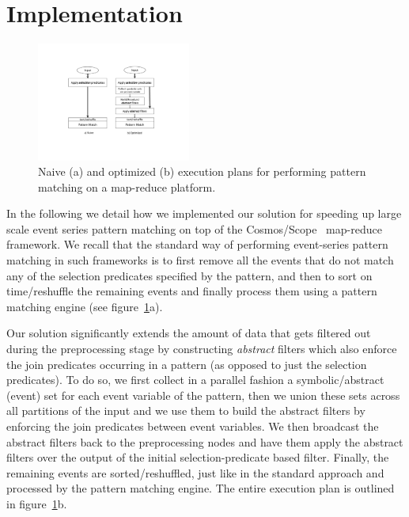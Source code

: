 \section{Implementation}
\label{sec:implementation}

\begin{figure}[tp]
\centering
\includegraphics[clip, trim=5.6cm 4.5cm 6.3cm 4.2cm, 
width=0.45\textwidth]{graphs/query_plan.pdf}
\caption{Naive (a) and optimized (b) execution plans for performing pattern 
matching on a map-reduce platform.}
\label{fig:query_plan}
\end{figure}


In the following we detail how we implemented our solution for speeding up 
large scale event series pattern matching on top of the 
Cosmos/Scope~\cite{Chaiken:2008} map-reduce framework.
We recall that the standard way of performing event-series pattern matching in 
such frameworks is to first remove all the events that do not match any of the 
selection predicates specified by the pattern, and then to sort on 
time/reshuffle the remaining events and finally process them using a pattern 
matching engine (see figure~\ref{fig:query_plan}a).

Our solution significantly extends the amount of data that gets filtered out 
during the preprocessing stage by constructing {\em abstract} filters which 
also enforce the join predicates occurring in a pattern (as opposed to just the 
selection predicates).
To do so, we first collect in a parallel fashion a symbolic/abstract (event) 
set for each event variable of the pattern, then we union these sets across all 
partitions of the input and we use them to build the abstract filters by 
enforcing the join predicates between event variables. 
We then broadcast the abstract filters back to the preprocessing nodes and have 
them apply the abstract filters over the output of the initial 
selection-predicate based filter. 
Finally, the remaining events are sorted/reshuffled, just like in the standard 
approach and processed by the pattern matching engine. The entire execution 
plan is outlined in figure~\ref{fig:query_plan}b.


